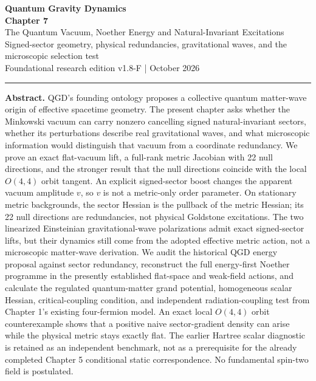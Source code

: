 \documentclass[11pt,a4paper]{article}
\theoremstyle{definition}\newtheorem{definition}[theorem]{Definition}
\theoremstyle{remark}\newtheorem{remark}[theorem]{Remark}
\begin{document}
\begin{center}
{\color{navy}\Large\bfseries Quantum Gravity Dynamics}\\[5pt]
{\LARGE\bfseries Chapter 7}\\[4pt]
{\Large The Quantum Vacuum, Noether Energy and Natural-Invariant Excitations}\\[7pt]
{\small Signed-sector geometry, physical redundancies, gravitational waves, and the microscopic selection test}\\[5pt]
{\small Foundational research edition v1.8-F \quad |  October 2026}
\end{center}
\vspace{5pt}\hrule\vspace{9pt}
\textbf{Abstract.} QGD's founding ontology proposes a collective quantum matter-wave origin of effective spacetime geometry. The present chapter asks whether the Minkowski vacuum can carry nonzero cancelling signed natural-invariant sectors, whether its perturbations describe real gravitational waves, and what microscopic information would distinguish that vacuum from a coordinate redundancy. We prove an exact flat-vacuum lift, a full-rank metric Jacobian with 22 null directions, and the stronger result that the null directions coincide with the local $O(4,4)$ orbit tangent. An explicit signed-sector boost changes the apparent vacuum amplitude $v$, so $v$ is not a metric-only order parameter. On stationary metric backgrounds, the sector Hessian is the pullback of the metric Hessian; its 22 null directions are redundancies, not physical Goldstone excitations. The two linearized Einsteinian gravitational-wave polarizations admit exact signed-sector lifts, but their dynamics still come from the adopted effective metric action, not a microscopic matter-wave derivation. We audit the historical QGD energy proposal against sector redundancy, reconstruct the full energy-first Noether programme in the presently established flat-space and weak-field actions, and calculate the regulated quantum-matter grand potential, homogeneous scalar Hessian, critical-coupling condition, and independent radiation-coupling test from Chapter 1's existing four-fermion model. An exact local $O(4,4)$ orbit counterexample shows that a positive naive sector-gradient density can arise while the physical metric stays exactly flat. The earlier Hartree scalar diagnostic is retained as an independent benchmark, not as a prerequisite for the already completed Chapter 5 conditional static correspondence. No fundamental spin-two field is postulated.
\end{document}
